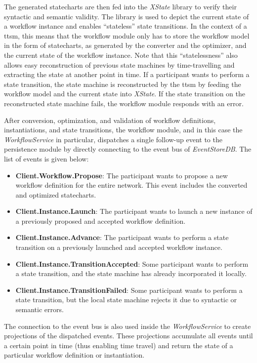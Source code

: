The generated statecharts are then fed into the \textit{XState} library to verify their syntactic and semantic validity. The library is used to depict the current state of a workflow instance and enables ``stateless'' state transitions. In the context of a \gls{ttsm}, this means that the workflow module only has to store the workflow model in the form of statecharts, as generated by the converter and the optimizer, and the current state of the workflow instance. Note that this ``statelessness'' also allows easy reconstruction of previous state machines by time-travelling and extracting the state at another point in time. If a participant wants to perform a state transition, the state machine is reconstructed by the \gls{ttsm} by feeding the workflow model and the current state into \textit{XState}. If the state transition on the reconstructed state machine fails, the workflow module responds with an error.

After conversion, optimization, and validation of workflow definitions, instantiations, and state transitions, the workflow module, and in this case the \textit{WorkflowService} in particular, dispatches a single follow-up event to the persistence module by directly connecting to the event bus of \textit{EventStoreDB}. The list of events is given below:

\begin{itemize}
    \item \textbf{Client.Workflow.Propose}: The participant wants to propose a new workflow definition for the entire network. This event includes the converted and optimized statecharts.
    \item \textbf{Client.Instance.Launch}: The participant wants to launch a new instance of a previously proposed and accepted workflow definition.
    \item \textbf{Client.Instance.Advance}: The participant wants to perform a state transition on a previously launched and accepted workflow instance.
    \item \textbf{Client.Instance.TransitionAccepted}: Some participant wants to perform a state transition, and the state machine has already incorporated it locally.
    \item \textbf{Client.Instance.TransitionFailed}: Some participant wants to perform a state transition, but the local state machine rejects it due to syntactic or semantic errors.
\end{itemize}

The connection to the event bus is also used inside the \textit{WorkflowService} to create projections of the dispatched events. These projections accumulate all events until a certain point in time (thus enabling time travel) and return the state of a particular workflow definition or instantiation.


